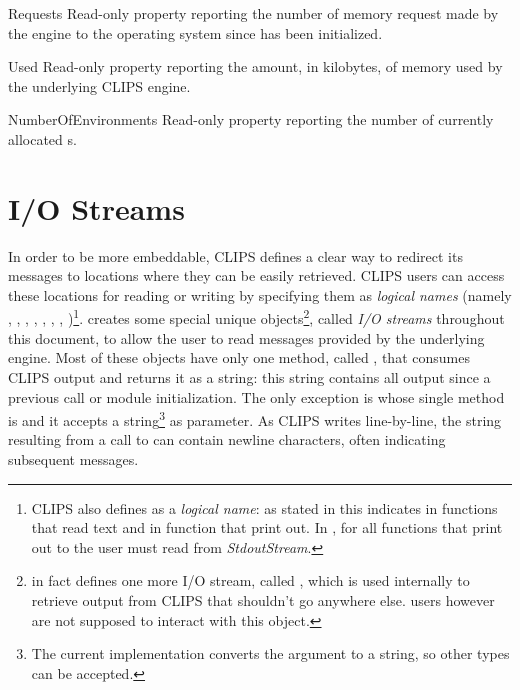 \begin{memberdesc}[property]{Requests}
Read-only property reporting the number of memory request made by the
engine to the operating system since \pyclips{} has been initialized.
\end{memberdesc}

\begin{memberdesc}[property]{Used}
Read-only property reporting the amount, in kilobytes, of memory used by
the underlying CLIPS engine.
\end{memberdesc}

\begin{memberdesc}[property]{NumberOfEnvironments}
Read-only property reporting the number of currently allocated
s.
\end{memberdesc}


\section{I/O Streams\label{pyclips-cl-iostreams}}

In order to be more embeddable, CLIPS defines a clear way to redirect its
messages to locations where they can be easily retrieved. CLIPS users can
access these locations for reading or writing by specifying them as
\emph{logical names} (namely , , ,
, , , ,
)\footnote{CLIPS also defines  as a \emph{logical
name}: as stated in \clipsapg{} this indicates  in functions
that read text and  in function that print out. In
\pyclips{}, for all functions that print out to  the user must
read from \emph{StdoutStream}.}. \pyclips{} creates some special unique
objects\footnote{\pyclips{} in fact defines one more I/O stream, called
, which is used internally to retrieve output from CLIPS
that shouldn't go anywhere else. \pyclips{} users however are not supposed
to interact with this object.}, called \emph{I/O streams} throughout this
document, to allow the user to read messages provided by the underlying
engine. Most of these objects have only one method, called ,
that consumes CLIPS output and returns it as a string: this string contains
all output since a previous call or module initialization. The only exception
is  whose single method is  and it
accepts a string\footnote{The current implementation converts the
argument to a string, so other types can be accepted.} as parameter. As
CLIPS writes line-by-line, the string resulting from a call to
 can contain newline characters, often indicating
subsequent messages.

